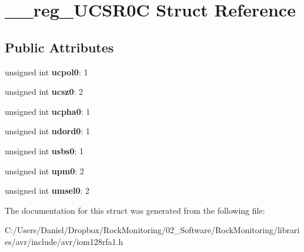 \hypertarget{struct____reg___u_c_s_r0_c}{}\section{\+\_\+\+\_\+reg\+\_\+\+U\+C\+S\+R0C Struct Reference}
\label{struct____reg___u_c_s_r0_c}
\subsection*{Public Attributes}
\begin{DoxyCompactItemize}
\item 
unsigned int {\bfseries ucpol0}\+: 1\hypertarget{struct____reg___u_c_s_r0_c_acab1866bcbca4716df3e26b07c87cde5}{}\label{struct____reg___u_c_s_r0_c_acab1866bcbca4716df3e26b07c87cde5}

\item 
unsigned int {\bfseries ucsz0}\+: 2\hypertarget{struct____reg___u_c_s_r0_c_aa22dd158883ae98a3fd169519e16b20b}{}\label{struct____reg___u_c_s_r0_c_aa22dd158883ae98a3fd169519e16b20b}

\item 
unsigned int {\bfseries ucpha0}\+: 1\hypertarget{struct____reg___u_c_s_r0_c_a06a13be471f4878d33f17242d4c849d4}{}\label{struct____reg___u_c_s_r0_c_a06a13be471f4878d33f17242d4c849d4}

\item 
unsigned int {\bfseries udord0}\+: 1\hypertarget{struct____reg___u_c_s_r0_c_aba492ccff2ef542c352f7bcf2a9059a5}{}\label{struct____reg___u_c_s_r0_c_aba492ccff2ef542c352f7bcf2a9059a5}

\item 
unsigned int {\bfseries usbs0}\+: 1\hypertarget{struct____reg___u_c_s_r0_c_a98ad65ea2bb7adb9c46aab8b6ab53374}{}\label{struct____reg___u_c_s_r0_c_a98ad65ea2bb7adb9c46aab8b6ab53374}

\item 
unsigned int {\bfseries upm0}\+: 2\hypertarget{struct____reg___u_c_s_r0_c_abfb2e8504a4bcfd30a5e9ee023a5a22a}{}\label{struct____reg___u_c_s_r0_c_abfb2e8504a4bcfd30a5e9ee023a5a22a}

\item 
unsigned int {\bfseries umsel0}\+: 2\hypertarget{struct____reg___u_c_s_r0_c_adfbec35ae69945dad8483ef0cf9ad465}{}\label{struct____reg___u_c_s_r0_c_adfbec35ae69945dad8483ef0cf9ad465}

\end{DoxyCompactItemize}


The documentation for this struct was generated from the following file\+:\begin{DoxyCompactItemize}
\item 
C\+:/\+Users/\+Daniel/\+Dropbox/\+Rock\+Monitoring/02\+\_\+\+Software/\+Rock\+Monitoring/libraries/avr/include/avr/iom128rfa1.\+h\end{DoxyCompactItemize}
